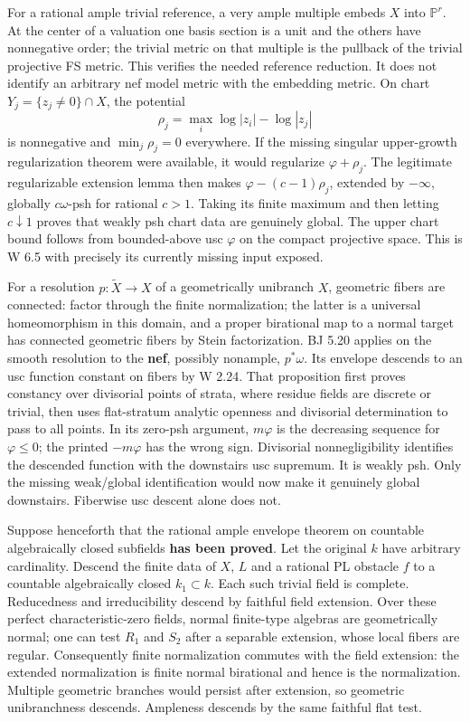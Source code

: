 \documentclass[
  11pt,
]{article}
\begin{document}
For a rational ample trivial reference, a very ample multiple embeds
\(X\) into \(\mathbb P^r\). At the center of a valuation one basis
section is a unit and the others have nonnegative order; the trivial
metric on that multiple is the pullback of the trivial projective FS
metric. This verifies the needed reference reduction. It does not
identify an arbitrary nef model metric with the embedding metric. On
chart \(Y_j=\{z_j\ne0\}\cap X\), the potential
\[\rho_j=\max_i\log|z_i|-\log|z_j|\] is nonnegative and
\(\min_j\rho_j=0\) everywhere. If the missing singular upper-growth
regularization theorem were available, it would regularize
\(\varphi+\rho_j\). The legitimate regularizable extension lemma then
makes \(\varphi-(c-1)\rho_j\), extended by \(-\infty\), globally
\(c\omega\)-psh for rational \(c>1\). Taking its finite maximum and then
letting \(c\downarrow1\) proves that weakly psh chart data are genuinely
global. The upper chart bound follows from bounded-above usc \(\varphi\)
on the compact projective space. This is W 6.5 with precisely its
currently missing input exposed.

For a resolution \(p:\widetilde X\to X\) of a geometrically unibranch
\(X\), geometric fibers are connected: factor through the finite
normalization; the latter is a universal homeomorphism in this domain,
and a proper birational map to a normal target has connected geometric
fibers by Stein factorization. BJ 5.20 applies on the smooth resolution
to the \textbf{nef}, possibly nonample, \(p^*\omega\). Its envelope
descends to an usc function constant on fibers by W 2.24. That
proposition first proves constancy over divisorial points of strata,
where residue fields are discrete or trivial, then uses flat-stratum
analytic openness and divisorial determination to pass to all points. In
its zero-psh argument, \(m\varphi\) is the decreasing sequence for
\(\varphi\leq0\); the printed \(-m\varphi\) has the wrong sign.
Divisorial nonnegligibility identifies the descended function with the
downstairs usc supremum. It is weakly psh. Only the missing weak/global
identification would now make it genuinely global downstairs. Fiberwise
usc descent alone does not.

Suppose henceforth that the rational ample envelope theorem on countable
algebraically closed subfields \textbf{has been proved}. Let the
original \(k\) have arbitrary cardinality. Descend the finite data of
\(X\), \(L\) and a rational PL obstacle \(f\) to a countable
algebraically closed \(k_1\subset k\). Each such trivial field is
complete. Reducedness and irreducibility descend by faithful field
extension. Over these perfect characteristic-zero fields, normal
finite-type algebras are geometrically normal; one can test \(R_1\) and
\(S_2\) after a separable extension, whose local fibers are regular.
Consequently finite normalization commutes with the field extension: the
extended normalization is finite normal birational and hence is the
normalization. Multiple geometric branches would persist after
extension, so geometric unibranchness descends. Ampleness descends by
the same faithful flat test.
\end{document}
